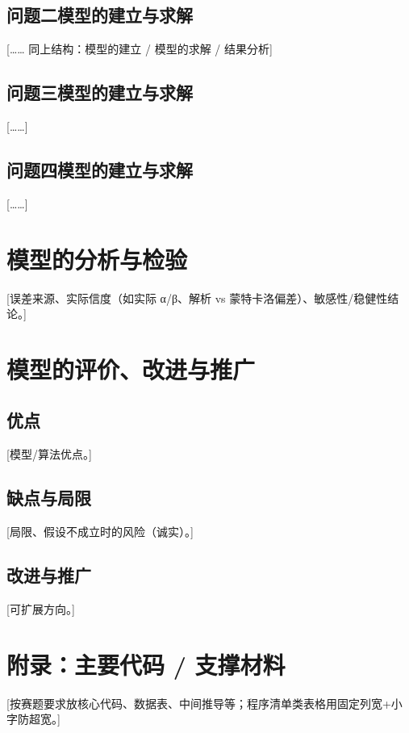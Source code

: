 \documentclass[12pt,a4paper]{article}
\begin{document}
\subsection{问题二模型的建立与求解}
[…… 同上结构：模型的建立 / 模型的求解 / 结果分析]

\subsection{问题三模型的建立与求解}
[……]

\subsection{问题四模型的建立与求解}
[……]

\section{模型的分析与检验}
[误差来源、实际信度（如实际 α/β、解析 vs 蒙特卡洛偏差）、敏感性/稳健性结论。]

\section{模型的评价、改进与推广}
\subsection{优点}
[模型/算法优点。]
\subsection{缺点与局限}
[局限、假设不成立时的风险（诚实）。]
\subsection{改进与推广}
[可扩展方向。]

% 

\appendix
\section{附录：主要代码 / 支撑材料}
[按赛题要求放核心代码、数据表、中间推导等；程序清单类表格用固定列宽+小字防超宽。]
\end{document}
